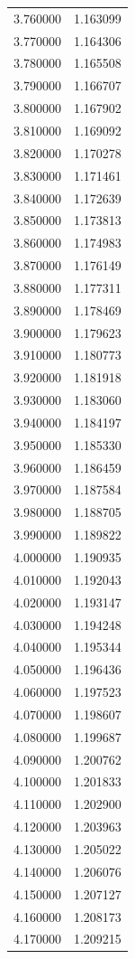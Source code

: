 \begin{tabular}{rr}
3.760000 & 1.163099 \\
3.770000 & 1.164306 \\
3.780000 & 1.165508 \\
3.790000 & 1.166707 \\
3.800000 & 1.167902 \\
3.810000 & 1.169092 \\
3.820000 & 1.170278 \\
3.830000 & 1.171461 \\
3.840000 & 1.172639 \\
3.850000 & 1.173813 \\
3.860000 & 1.174983 \\
3.870000 & 1.176149 \\
3.880000 & 1.177311 \\
3.890000 & 1.178469 \\
3.900000 & 1.179623 \\
3.910000 & 1.180773 \\
3.920000 & 1.181918 \\
3.930000 & 1.183060 \\
3.940000 & 1.184197 \\
3.950000 & 1.185330 \\
3.960000 & 1.186459 \\
3.970000 & 1.187584 \\
3.980000 & 1.188705 \\
3.990000 & 1.189822 \\
4.000000 & 1.190935 \\
4.010000 & 1.192043 \\
4.020000 & 1.193147 \\
4.030000 & 1.194248 \\
4.040000 & 1.195344 \\
4.050000 & 1.196436 \\
4.060000 & 1.197523 \\
4.070000 & 1.198607 \\
4.080000 & 1.199687 \\
4.090000 & 1.200762 \\
4.100000 & 1.201833 \\
4.110000 & 1.202900 \\
4.120000 & 1.203963 \\
4.130000 & 1.205022 \\
4.140000 & 1.206076 \\
4.150000 & 1.207127 \\
4.160000 & 1.208173 \\
4.170000 & 1.209215 \\

\end{tabular}
